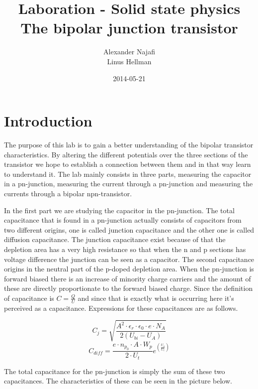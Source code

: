 \documentclass[a4paper]{article}
\title{Laboration - Solid state physics\\ The bipolar junction transistor}
\author{Alexander Najafi \\ Linus Hellman}
\date{2014-05-21}
\begin{document}
\maketitle
\thispagestyle{empty}
\newpage

\tableofcontents
\newpage
\section{Introduction}
The purpose of this lab is to gain a better understanding of the bipolar transistor characteristics. By altering the different potentials over the three sections of the transistor we hope to establish a connection between them and in that way learn to understand it. The lab mainly consists in three parts, measuring the capacitor in a pn-junction, measuring the current through a pn-junction and measuring the currents through a bipolar npn-transistor.

In the first part we are studying the capacitor in the pn-junction. The total capacitance that is found in a pn-junction actually consists of capacitors from two different origins, one is called junction capacitance and the other one is called diffusion capacitance. The junction capacitance exist because of that the depletion area has a very high resistance so that when the n and p sections has voltage difference the junction can be seen as a capacitor. The second capacitance origins in the neutral part of the p-doped depletion area. When the pn-junction is forward biased there is an increase of minority charge carriers and the amount of these are directly proportionate to the forward biased charge. Since the definition of capacitance is $C=\frac{Q}{U}$ and since that is exactly what is occurring here it's perceived as a capacitance. Expressions for these capacitances are as follows.

\begin{equation}
C_j=\sqrt{\frac{A^2{\cdot}\epsilon_r{\cdot}\epsilon_0{\cdot}e{\cdot}N_A}{2(U_{bi}-U_A)}}
\end{equation}
\begin{equation}
C_{diff}=\frac{e{\cdot}n_{p_0}{\cdot}A{\cdot}W_p}{2{\cdot}U_t}e^{(\frac{U_a}{U_t})}
\end{equation}

The total capacitance for the pn-junction is simply the sum of these two capacitances. The characteristics of these can be seen in the picture below.
\end{document}
